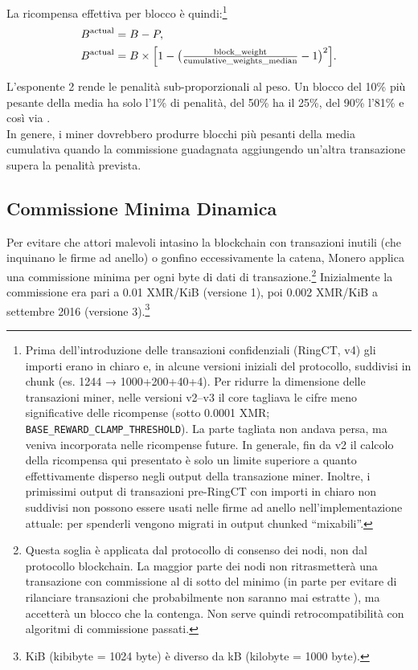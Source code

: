 La ricompensa effettiva per blocco è quindi:\footnote{Prima dell’introduzione delle transazioni confidenziali (RingCT, v4) gli importi erano in chiaro e, in alcune versioni iniziali del protocollo, suddivisi in chunk (es. 1244 → 1000+200+40+4). Per ridurre la dimensione delle transazioni miner, nelle versioni v2–v3 il core tagliava le cifre meno significative delle ricompense (sotto 0.0001 XMR; {\tt BASE\_REWARD\_CLAMP\_THRESHOLD}). La parte tagliata non andava persa, ma veniva incorporata nelle ricompense future. In generale, fin da v2 il calcolo della ricompensa qui presentato è solo un limite superiore a quanto effettivamente disperso negli output della transazione miner. Inoltre, i primissimi output di transazioni pre-RingCT con importi in chiaro non suddivisi non possono essere usati nelle firme ad anello nell’implementazione attuale: per spenderli vengono migrati in output chunked “mixabili”.} \vspace{.3cm}
\begin{align*}
  B^{\mathrm{actual}} &= B - P,\\
  B^{\mathrm{actual}} &= B \times \Bigl[1 - \bigl(\tfrac{\text{block\_weight}}{\text{cumulative\_weights\_median}} - 1\bigr)^2\Bigr].
\end{align*}

L’esponente 2 rende le penalità sub-proporzionali al peso. Un blocco del 10\% più pesante della media ha solo l’1\% di penalità, del 50\% ha il 25\%, del 90\% l’81\% e così via \cite{monero-coin-emission}.\\

In genere, i miner dovrebbero produrre blocchi più pesanti della media cumulativa quando la commissione guadagnata aggiungendo un’altra transazione supera la penalità prevista.


\subsection{Commissione Minima Dinamica}
\label{subsec:dynamic-minimum-fee} %

Per evitare che attori malevoli intasino la blockchain con transazioni inutili (che inquinano le firme ad anello) o gonfino eccessivamente la catena, Monero applica una commissione minima per ogni byte di dati di transazione.\footnote{Questa soglia è applicata dal protocollo di consenso dei nodi, non dal protocollo blockchain. La maggior parte dei nodi non ritrasmetterà una transazione con commissione al di sotto del minimo (in parte per evitare di rilanciare transazioni che probabilmente non saranno mai estratte \cite{articmine-36c3-dynamics}), ma accetterà un blocco che la contenga. Non serve quindi retrocompatibilità con algoritmi di commissione passati.} Inizialmente la commissione era pari a 0.01 XMR/KiB (versione 1)\cite{fee-old-stackexchange}, poi 0.002 XMR/KiB a settembre 2016 (versione 3).\footnote{KiB (kibibyte = 1024 byte) è diverso da kB (kilobyte = 1000 byte).}

